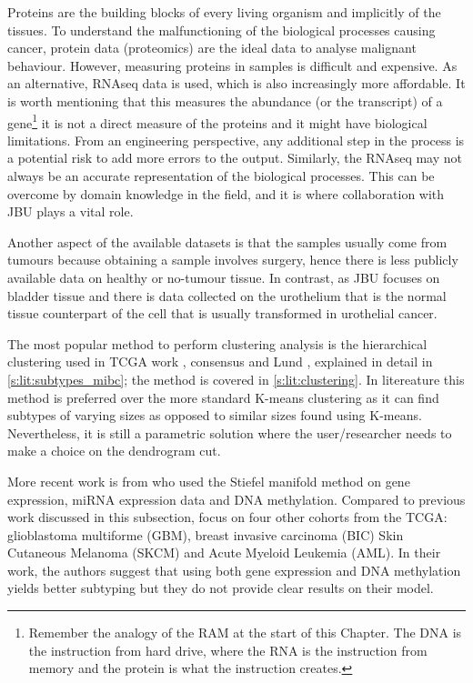Proteins are the building blocks of every living organism and implicitly of the tissues. To understand the malfunctioning of the biological processes causing cancer, protein data (proteomics) are the ideal data to analyse malignant behaviour. However, measuring proteins in samples is difficult and expensive. As an alternative, RNAseq data is used, which is also increasingly more affordable. It is worth mentioning that this measures the abundance (or the transcript) of a gene\footnote{Remember the analogy of the RAM at the start of this Chapter. The DNA is the instruction from hard drive, where the RNA is the instruction from memory and the protein is what the instruction creates.} it is not a direct measure of the proteins and it might have biological limitations. From an engineering perspective, any additional step in the process is a potential risk to add more errors to the output. Similarly, the RNAseq may not always be an accurate representation of the biological processes. This can be overcome by domain knowledge in the field, and it is where collaboration with JBU plays a vital role.

Another aspect of the available datasets is that the samples usually come from tumours because obtaining a sample involves surgery, hence there is less publicly available data on healthy or no-tumour tissue. In contrast, as JBU focuses on bladder tissue  and there is data collected on the urothelium that is the normal tissue counterpart of the cell that is usually transformed in urothelial cancer.

The most popular method to perform clustering analysis is the hierarchical clustering used in TCGA work \citep{Robertson2017-mg}, consensus \citep{Kamoun2020-tj} and Lund \citep{Sjodahl2017-xr}, explained in detail in \cref{s:lit:subtypes_mibc}; the method is covered in \cref{s:lit:clustering}. In litereature this method is preferred over the more standard K-means clustering as it can find subtypes of varying sizes as opposed to similar sizes found using K-means. Nevertheless, it is still a parametric solution where the user/researcher needs to make a choice on the dendrogram cut.

More recent work is from \citet{Tian2021-vu} who used the Stiefel manifold method on gene expression, miRNA expression data and DNA methylation. Compared to previous work discussed in this subsection, \citet{Tian2021-vu} focus on four other cohorts from the TCGA: glioblastoma multiforme (GBM), breast invasive carcinoma (BIC) Skin Cutaneous Melanoma (SKCM) and Acute Myeloid Leukemia (AML). In their work, the authors suggest that using both gene expression and DNA methylation yields better subtyping but they do not provide clear results on their model.

